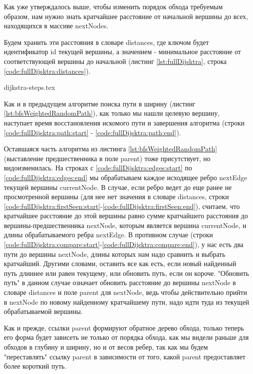 \documentclass[../../article.tex]{subfiles}
\begin{document}
Как уже утверждалось выше, чтобы изменить порядок обхода требуемым образом, нам нужно знать кратчайшее расстояние от начальной вершины до всех, находящихся в массиве {\firacodebold nextNodes}.

Будем хранить эти расстояния в словаре {\firacodebold distances}, где ключом будет  идентификатор {\firacodebold id} текущей вершины, а значением - минимальное расстояние от соответствующей вершины до начальной (листинг \ref{lst:fullDijsktra}, строка \ref{code:fullDijsktra:distances}).

{dijkstra-steps.tex}

Как и в предыдущем алгоритме поиска пути в ширину (листинг \ref{lst:bfsWeightedRandomPath}), как только мы нашли целевую вершину, наступает время восстановления искомого пути и завершения алгоритма (строки \ref{code:fullDijsktra:path:start} - \ref{code:fullDijsktra:path:end}).

Оставшаяся часть алгоритма из листинга \ref{lst:bfsWeightedRandomPath} (выставление предшественника в поле {\firacodebold parent}) тоже присутствует, но видоизменилась. На строках с \ref{code:fullDijsktra:edges:start} по \ref{code:fullDijsktra:edges:end} мы обрабатываем каждое исходящее ребро {\firacodebold nextEdge} текущей вершины {\firacodebold currentNode}. В случае, если ребро ведет до еще ранее не просмотренной вершины (для нее нет значения в словаре {\firacodebold distances}, строки \ref{code:fullDijsktra:firstSeen:start}-\ref{code:fullDijsktra:firstSeen:end}), считаем, что кратчайшее расстояние до этой вершины равно сумме кратчайшего расстояния до вершины-предшественника {\firacodebold nextNode}, которым является вершина {\firacodebold currentNode}, и длины обрабатываемого ребра {\firacodebold nextEdge}. В противном случае (строки \ref{code:fullDijsktra:compare:start}-\ref{code:fullDijsktra:compare:end}), у нас есть два пути до вершины {\firacodebold nextNode}, длины которых нам надо сравнить и выбрать кратчайший. Другими словами, оставить все как есть, если новый найденный путь длиннее или равен текущему, или обновить путь, если он короче. "Обновить путь" в данном случае означает обновить расстояние до вершины {\firacodebold nextNode} в словаре {\firacodebold distances} и поле {\firacodebold parent} для {\firacodebold nextNode}, ведь чтобы действительно прийти в {\firacodebold nextNode} по новому найденному кратчайшему пути, надо идти туда из текущей обрабатываемой вершины.

Как и прежде, ссылки {\firacodebold parent} формируют обратное дерево обхода, только теперь его форма будет зависеть не только от порядка обхода, как мы видели раньше для обходов в глубину и ширину, но и от весов ребер, так как мы будем "переставлять" ссылку {\firacodebold parent} в зависимости от того, какой {\firacodebold parent} предоставляет более короткий путь.
\end{document}
